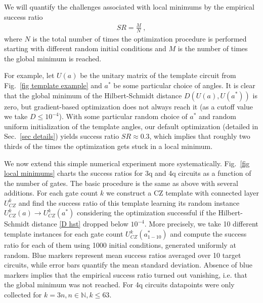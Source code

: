 \documentclass[twocolumn, amsfonts, amssymb, aps, nofootinbib]{revtex4-2}
\newcommand{\CZ}{\textsf{CZ }}
\begin{document}
We will quantify the challenges associated with local minimums by the empirical success ratio
\begin{align}
	SR=\frac{M}{N} \ ,
\end{align}
where $N$ is the total number of times the optimization procedure is performed starting with different random initial conditions and $M$ is the number of times the global minimum is reached.

For example, let $U(a)$ be the unitary matrix of the template circuit from Fig.~\ref{fig template example} and $a^*$ be some particular choice of angles. It is clear that the global minimum of the Hilbert-Schmidt distance $D(U(a), U(a^*))$ is zero, but gradient-based optimization does not always reach it (as a cutoff value we take $D\le 10^{-4}$). With some particular random choice of $a^*$ and random uniform initialization of the template angles, our default optimization (detailed in Sec.~\ref{sec details}) yields success ratio $SR\approx0.3$, which implies that roughly two thirds of the times the optimization gets stuck in a local minimum.

We now extend this simple numerical experiment more systematically. Fig.~\ref{fig local minimums} charts the success ratios for 3q and 4q circuits as a function of the number of gates. The basic procedure is the same as above with several additions. For each gate count $k$ we construct a \CZ template with connected layer $U^k_{CZ}$ and find the success ratio of this template learning its random instance $U^k_{CZ}(a)\to U^k_{CZ}(a^*)$ considering the optimization successful if the Hilbert-Schmidt distance \eqref{D hst} dropped below $10^{-4}$. More precisely, we take 10 different template instances for each gate count $U^k_{CZ}(a^*_{1-10})$ and compute the success ratio for each of them using 1000 initial conditions, generated uniformly at random. Blue markers represent mean success ratios averaged over 10 target circuits, while error bars quantify the mean standard deviation. Absence of blue markers implies that the empirical success ratio turned out vanishing, i.e. that the global minimum was not reached. For 4q circuits datapoints were only collected for $k=3n, n\in\mathbb{N}, k\le 63$.
\end{document}
